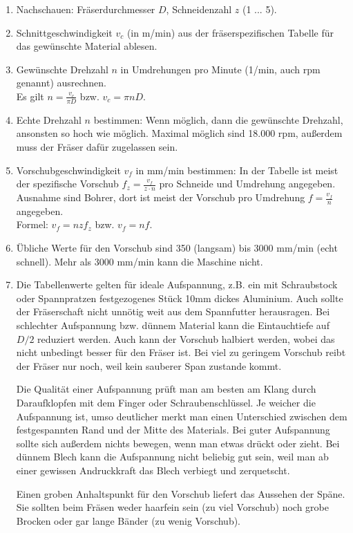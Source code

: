 \documentclass{\basedir/fablab-document}
\begin{document}
\begin{enumerate}
	\item Nachschauen: Fräserdurchmesser $D$, Schneidenzahl $z$ (1 ... 5).
	\item Schnittgeschwindigkeit $v_c$ (in m/min) aus der fräserspezifischen Tabelle für das gewünschte Material ablesen.
	\item Gewünschte Drehzahl $n$ in Umdrehungen pro Minute (1/min, auch rpm genannt) ausrechnen.\\
		Es gilt $n=\frac{v_c}{\pi D}$ bzw. $v_c=\pi n D$.
	\item Echte Drehzahl $n$ bestimmen: Wenn möglich, dann die gewünschte Drehzahl, ansonsten so hoch wie möglich. Maximal möglich sind 18.000 rpm, außerdem muss der Fräser dafür zugelassen sein.
	\item Vorschubgeschwindigkeit $v_f$ in mm/min bestimmen: In der Tabelle ist meist der spezifische Vorschub $f_z=\frac{v_f}{z\cdot n}$ pro Schneide und Umdrehung angegeben. Ausnahme sind Bohrer, dort ist meist der Vorschub pro Umdrehung $f=\frac{v_f}{n}$ angegeben. \\
		Formel: $v_f = n z f_z$ bzw. $v_f=n f$.
	\item Übliche Werte für den Vorschub sind 350 (langsam) bis 3000 mm/min (echt schnell). Mehr als 3000 mm/min kann die Maschine nicht.
	\item Die Tabellenwerte gelten für ideale Aufspannung, z.B. ein mit Schraubstock oder Spannpratzen festgezogenes Stück 10mm dickes Aluminium. Auch sollte der Fräserschaft nicht unnötig weit aus dem Spannfutter herausragen. Bei schlechter Aufspannung bzw. dünnem Material kann die Eintauchtiefe auf $D/2$ reduziert werden. Auch kann der Vorschub halbiert werden, wobei das nicht unbedingt besser für den Fräser ist. Bei viel zu geringem Vorschub reibt der Fräser nur noch, weil kein sauberer Span zustande kommt.

		Die Qualität einer Aufspannung prüft man am besten am Klang durch Daraufklopfen mit dem Finger oder Schraubenschlüssel. Je weicher die Aufspannung ist, umso deutlicher merkt man einen Unterschied zwischen dem festgespannten Rand und der Mitte des Materials. Bei guter Aufspannung sollte sich außerdem nichts bewegen, wenn man etwas drückt oder zieht. Bei dünnem Blech kann die Aufspannung nicht beliebig gut sein, weil man ab einer gewissen Andruckkraft das Blech verbiegt und zerquetscht.
		
		Einen groben Anhaltspunkt für den Vorschub liefert das Aussehen der Späne. Sie sollten beim Fräsen weder haarfein sein (zu viel Vorschub) noch grobe Brocken oder gar lange Bänder (zu wenig Vorschub).
\end{enumerate}
\end{document}
